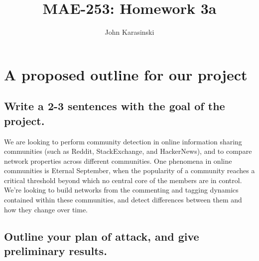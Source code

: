 \documentclass{tufte-handout}
\begin{document}
\title{MAE-253: Homework 3a}
\author[John Karasinski]{John Karasinski}
\maketitle%

\section{A proposed outline for our project}

\subsection{Write a 2-3 sentences with the goal of the project.}
We are looking to perform community detection in online information sharing communities (such as Reddit, StackExchange, and HackerNews), and to compare network properties across different communities. One phenomena in online communities is Eternal September, when the popularity of a community reaches a critical threshold beyond which no central core of the members are in control. We're looking to build networks from the commenting and tagging dynamics contained within these communities, and detect differences between them and how they change over time.

\subsection{Outline your plan of attack, and give preliminary results.}
\end{document}
